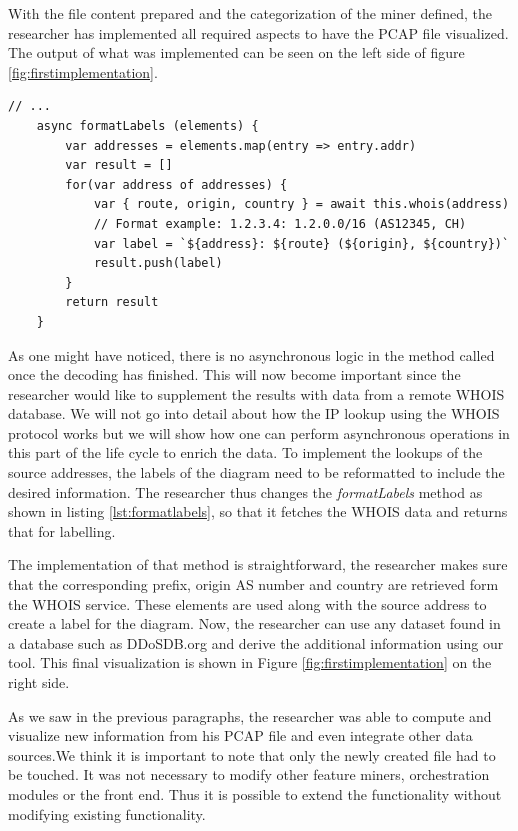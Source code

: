 With the file content prepared and the categorization of the miner defined, the researcher has implemented all required aspects to have the PCAP file visualized. The output of what was implemented can be seen on the left side of figure \ref{fig:firstimplementation}.

\begin{lstlisting}[caption={Initial content of the newly create Miner},label={lst:formatlabels}]
    // ...
    async formatLabels (elements) {
        var addresses = elements.map(entry => entry.addr)
        var result = []
        for(var address of addresses) {
            var { route, origin, country } = await this.whois(address)
            // Format example: 1.2.3.4: 1.2.0.0/16 (AS12345, CH)
            var label = `${address}: ${route} (${origin}, ${country})`
            result.push(label)
        }
        return result
    }
\end{lstlisting}

As one might have noticed, there is no asynchronous logic in the method called once the decoding has finished. This will now become important since the researcher would like to supplement the results with data from a remote WHOIS database. We will not go into detail about how the IP lookup using the WHOIS protocol works but we will show how one can perform asynchronous operations in this part of the life cycle to enrich the data.
To implement the lookups of the source addresses, the labels of the diagram need to be reformatted to include the desired information. The researcher thus changes the \textit{formatLabels} method as shown in listing \ref{lst:formatlabels}, so that it fetches the WHOIS data and returns that for labelling.

The implementation of that method is straightforward, the researcher makes sure that the corresponding prefix, origin AS number and country are retrieved form the WHOIS service. These elements are used along with the source address to create a label for the diagram. Now, the researcher can use any dataset found in a database such as DDoSDB.org and derive the additional information using our tool. This final visualization is shown in Figure \ref{fig:firstimplementation} on the right side.

As we saw in the previous paragraphs, the researcher was able to compute and visualize new information from his PCAP file and even integrate other data sources.We think it is important to note that only the newly created file had to be touched. It was not necessary to modify other feature miners, orchestration modules or the front end. Thus it is possible to extend the functionality without modifying existing functionality.

